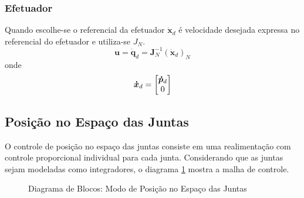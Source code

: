 \subsubsection{Efetuador}
Quando escolhe-se o referencial da efetuador $\bm{\dot{x}}_d$ é velocidade desejada expressa no referencial do efetuador e utiliza-se $J_N$.
\begin{equation}
\bm{u} = \bm{\dot{q}}_d = \bm{J}_N^{-1} (\bm{\dot{x}}_d)_N
\end{equation}
onde 
\begin{equation}
\bm{\dot{x}}_d = \begin{bmatrix}\bm{\dot{p}}_d \\ 0\end{bmatrix}
\end{equation}

\subsection{Posição no Espaço das Juntas}
O controle de posição no espaço das juntas consiste em uma realimentação com controle proporcional individual para cada junta. Considerando que as juntas sejam modeladas como integradores, o diagrama \ref{fig:pos_juntas} mostra a malha de controle.

\begin{figure}[h!]
\centering
{}
\caption{Diagrama de Blocos: Modo de Posição no Espaço das Juntas}
\label{fig:pos_juntas}
\end{figure}

